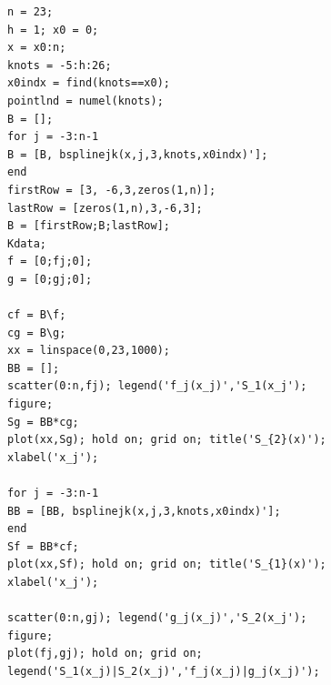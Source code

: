 \documentclass[14pt,a4paper]{article}
\begin{document}
	\begin{lstlisting}
n = 23;
h = 1; x0 = 0;
x = x0:n;
knots = -5:h:26;
x0indx = find(knots==x0);
pointlnd = numel(knots);
B = [];
for j = -3:n-1
B = [B, bsplinejk(x,j,3,knots,x0indx)'];
end
firstRow = [3, -6,3,zeros(1,n)];
lastRow = [zeros(1,n),3,-6,3];
B = [firstRow;B;lastRow];
Kdata;
f = [0;fj;0];
g = [0;gj;0];

cf = B\f;
cg = B\g;
xx = linspace(0,23,1000);
BB = [];
scatter(0:n,fj); legend('f_j(x_j)','S_1(x_j');
figure;
Sg = BB*cg;
plot(xx,Sg); hold on; grid on; title('S_{2}(x)');
xlabel('x_j');

for j = -3:n-1
BB = [BB, bsplinejk(x,j,3,knots,x0indx)'];
end
Sf = BB*cf;
plot(xx,Sf); hold on; grid on; title('S_{1}(x)');
xlabel('x_j');

scatter(0:n,gj); legend('g_j(x_j)','S_2(x_j');
figure;
plot(fj,gj); hold on; grid on;
legend('S_1(x_j)|S_2(x_j)','f_j(x_j)|g_j(x_j)');

	\end{lstlisting}
\end{document}
